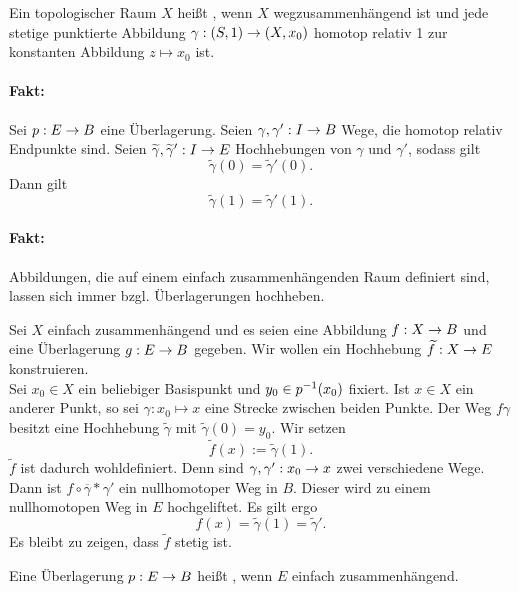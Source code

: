 \Def{}
Ein topologischer Raum $X$ heißt , wenn $X$ wegzusammenhängend ist und jede stetige punktierte Abbildung $\gamma : (S,1) \overset{}{\rightarrow} (X,x_0)$ homotop relativ 1 zur konstanten Abbildung $z\mapsto x_0$ ist.

\paragraph{Fakt:}
Sei $p : E\overset{}{\rightarrow} B$ eine Überlagerung. Seien $\gamma, \gamma' : I \overset{}{\rightarrow} B$ Wege, die homotop relativ Endpunkte sind. Seien $\widetilde{\gamma}, \widetilde{\gamma}' : I \overset{}{\rightarrow} E$ Hochhebungen von $\gamma$ und $\gamma'$, sodass gilt
\[ \widetilde{\gamma}(0) = \widetilde{\gamma}'(0). \]
Dann gilt
\[ \widetilde{\gamma}(1) = \widetilde{\gamma}'(1). \]

\paragraph{Fakt:}
Abbildungen, die auf einem einfach zusammenhängenden Raum definiert sind, lassen sich immer bzgl. Überlagerungen hochheben.
\begin{Beweis}{}
Sei $X$ einfach zusammenhängend und es seien eine Abbildung $f : X \overset{}{\rightarrow} B$ und eine Überlagerung $g : E \overset{}{\rightarrow} B$ gegeben. Wir wollen ein Hochhebung $\widetilde{f} : X \overset{}{\rightarrow} E$ konstruieren.\\
Sei $x_0 \in X$ ein beliebiger Basispunkt und $y_0 \in p^{-1}(x_0)$ fixiert. Ist $x\in X$ ein anderer Punkt, so sei $\gamma : x_0 \mapsto x$ eine Strecke zwischen beiden Punkte. Der Weg $f\gamma$ besitzt eine Hochhebung $\widetilde{\gamma}$ mit $\widetilde{\gamma}(0) = y_0$. Wir setzen
\[ \widetilde{f}(x):= \widetilde{\gamma}(1). \]
$\widetilde{f}$ ist dadurch wohldefiniert. Denn sind $\gamma, \gamma': x_0 \overset{}{\rightarrow} x$ zwei verschiedene Wege. Dann ist $f\circ \overline{\gamma}*\gamma'$ ein nullhomotoper Weg in $B$. Dieser wird zu einem nullhomotopen Weg in $E$ hochgeliftet. Es gilt ergo
\[ f(x) = \widetilde{\gamma}(1) = \widetilde{\gamma}'. \] 
Es bleibt zu zeigen, dass $\widetilde{f}$ stetig ist.
\end{Beweis}

\Def{}
Eine Überlagerung $p : E \overset{}{\rightarrow} B$ heißt , wenn $E$ einfach zusammenhängend.\\\\



